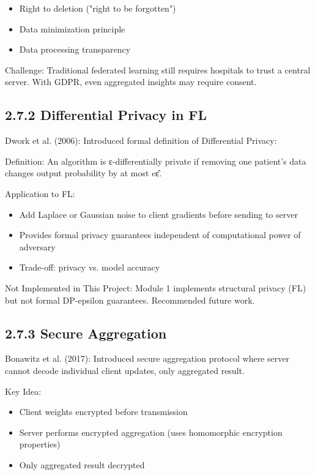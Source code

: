 \begin{itemize}
  \item Right to deletion ("right to be forgotten")
  \item Data minimization principle
  \item Data processing transparency
\end{itemize}

Challenge: Traditional federated learning still requires hospitals to trust a central server. With GDPR, even aggregated insights may require consent.


\subsection{2.7.2 Differential Privacy in FL}
Dwork et al. (2006): Introduced formal definition of Differential Privacy:

Definition: An algorithm is ε-differentially private if removing one patient's data changes output probability by at most e\^ε.

Application to FL:

\begin{itemize}
  \item Add Laplace or Gaussian noise to client gradients before sending to server
  \item Provides formal privacy guarantees independent of computational power of adversary
  \item Trade-off: privacy vs. model accuracy
\end{itemize}

Not Implemented in This Project: Module 1 implements structural privacy (FL) but not formal DP-epsilon guarantees. Recommended future work.


\subsection{2.7.3 Secure Aggregation}
Bonawitz et al. (2017): Introduced secure aggregation protocol where server cannot decode individual client updates, only aggregated result.

Key Idea:

\begin{itemize}
  \item Client weights encrypted before transmission
  \item Server performs encrypted aggregation (uses homomorphic encryption properties)
  \item Only aggregated result decrypted
\end{itemize}

